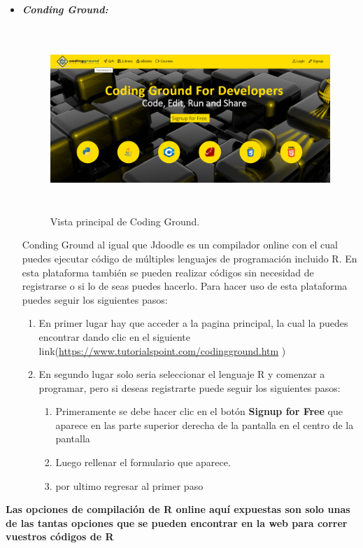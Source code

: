 \documentclass{article}
\begin{document}
\begin{itemize}
\item \textbf{\textit{Conding Ground: }}
\begin{figure}[H]
\centering
\includegraphics[width=12cm,height=7cm]{imagenes/CodingGraund.png}
\caption{\label{fig3:frog}Vista principal de Coding Ground.}
\end{figure}
Conding Ground al igual que Jdoodle es un compilador online con el cual puedes ejecutar código de múltiples lenguajes de programación incluido R. En esta plataforma también se pueden realizar códigos sin necesidad de registrarse o si lo de seas puedes hacerlo. Para hacer uso de esta plataforma puedes seguir los siguientes pasos: 
\begin{enumerate}
    \item En primer lugar hay que acceder a la pagina principal, la cual la puedes encontrar dando clic en el siguiente link(\url{https://www.tutorialspoint.com/codingground.htm} )
    \item En segundo lugar solo seria seleccionar el lenguaje R y comenzar a programar, pero si deseas registrarte puede seguir los siguientes pasos: 
    \begin{enumerate}
        \item  Primeramente se debe hacer clic en el botón \textbf{Signup for Free} que aparece en las parte superior derecha de la pantalla en el centro de la pantalla
        \item Luego rellenar el formulario que aparece.
        \item por ultimo regresar al primer paso
    \end{enumerate}
   
\end{enumerate}
\end{itemize}
\textbf{Las opciones de compilación de R online aquí expuestas  son solo unas de las tantas opciones que se pueden encontrar en la web para correr vuestros códigos de R}
\end{document}
